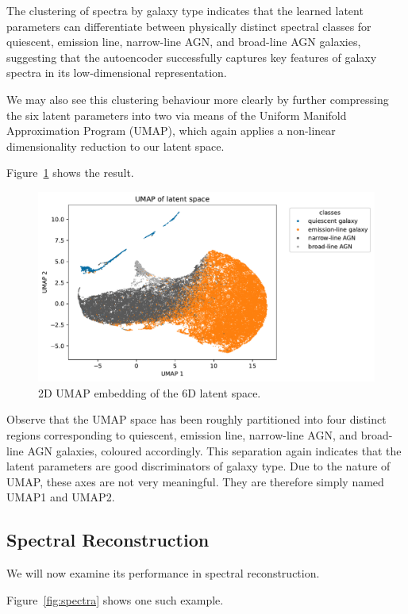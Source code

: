 \documentclass[11pt]{article}
\begin{document}
The clustering of spectra by galaxy type indicates that the learned latent parameters can differentiate between physically distinct spectral classes for quiescent, emission line, narrow-line AGN, and broad-line AGN galaxies, suggesting that the autoencoder successfully captures key features of galaxy spectra in its low-dimensional representation.

We may also see this clustering behaviour more clearly by further compressing the six latent parameters into two via means of the Uniform Manifold Approximation Program (UMAP), which again applies a non-linear dimensionality reduction to our latent space.

Figure~\ref{fig:umap} shows the result.

\begin{figure}[h!]
    \centering
    \includegraphics[width=\textwidth]{umap.pdf}
    \caption{2D UMAP embedding of the 6D latent space.}
    \label{fig:umap}
\end{figure}

Observe that the UMAP space has been roughly partitioned into four distinct regions corresponding to quiescent, emission line, narrow-line AGN, and broad-line AGN galaxies, coloured accordingly. This separation again indicates that the latent parameters are good discriminators of galaxy type. Due to the nature of UMAP, these axes are not very meaningful. They are therefore simply named UMAP1 and UMAP2.

\subsection{Spectral Reconstruction}
We will now examine its performance in spectral reconstruction.

Figure~\ref{fig:spectra} shows one such example.
\end{document}
